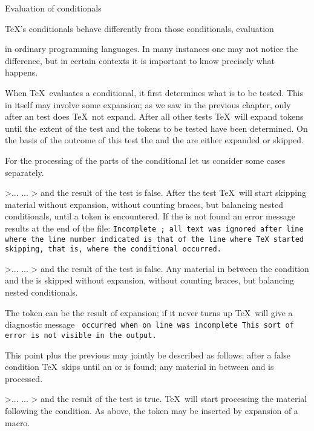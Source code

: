 \point Evaluation of conditionals

\TeX's conditionals behave differently from those
\term conditionals, evaluation\par
in ordinary programming languages. In many instances
one may not notice the difference, but in certain contexts
it is important to know precisely what happens.

When \TeX\ evaluates a conditional, it first determines
what is to be tested. This in itself may involve some
expansion; as we saw in the previous chapter, 
only after an  test
does \TeX\  not expand. After all other tests \TeX\ will
expand tokens until the extent of the test and the tokens
to be tested have been determined. On the basis of the outcome
of this test the  and the 
are either expanded or skipped.

For the processing of the parts of the conditional
let us consider some cases separately.
\itemlist
\item \ver>\if... ... \fi> and the result of the test is false.
 After the test \TeX\ will start skipping material
 without expansion, without counting braces, but balancing
 nested conditionals, until a  token is encountered.
 If the  is not found an error message results
 at the end of the file:
 \disp\tt Incomplete ; all text was ignored after line 
 \dispstop where the line number indicated is that of the line
 where \TeX\ started skipping, that is, where the conditional
 occurred.

\item \ver>\if... \else ... \fi> and the result of the test is false.
 Any material in between the condition and the  is skipped
 without expansion, without counting braces, but balancing nested
 conditionals.

 The  token can be the result of expansion; if it never
 turns up \TeX\ will give a diagnostic message
 \disp\tt {} occurred when  on line 
      was incomplete\dispstop
 This sort of error is not visible in the output.

 This point plus the previous may jointly be described as follows:
 after a false condition \TeX\ skips until an  or 
 is found; any material in between  and  is processed.
 
\item \ver>\if... ... \fi> and the result of the test is true.
 \TeX\ will start processing the material following the condition.
 As above, the  token may be inserted by expansion of
 a macro.
 

